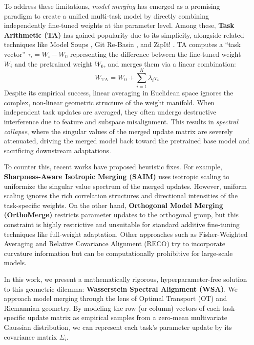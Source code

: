\documentclass{article}
\theoremstyle{plain}
\theoremstyle{definition}
\theoremstyle{remark}
\begin{document}
To address these limitations, \emph{model merging} has emerged as a promising paradigm to create a unified multi-task model by directly combining independently fine-tuned weights at the parameter level. Among these, \textbf{Task Arithmetic (TA)} \cite{ilharco22} has gained popularity due to its simplicity, alongside related techniques like Model Soups \cite{wortsman22}, Git Re-Basin \cite{ainsworth22}, and ZipIt! \cite{stoica23}. TA computes a ``task vector'' $\tau_i = W_i - W_0$ representing the difference between the fine-tuned weight $W_i$ and the pretrained weight $W_0$, and merges them via a linear combination:
\begin{equation}
  W_{\text{TA}} = W_0 + \sum_{i=1}^K \lambda_i \tau_i
\end{equation}
Despite its empirical success, linear averaging in Euclidean space ignores the complex, non-linear geometric structure of the weight manifold. When independent task updates are averaged, they often undergo destructive interference due to feature and subspace misalignment. This results in \emph{spectral collapse}, where the singular values of the merged update matrix are severely attenuated, driving the merged model back toward the pretrained base model and sacrificing downstream adaptations.

To counter this, recent works have proposed heuristic fixes. For example, \textbf{Sharpness-Aware Isotropic Merging (SAIM)} \cite{saim} uses isotropic scaling to uniformize the singular value spectrum of the merged updates. However, uniform scaling ignores the rich correlation structures and directional intensities of the task-specific weights. On the other hand, \textbf{Orthogonal Model Merging (OrthoMerge)} \cite{orthomerge} restricts parameter updates to the orthogonal group, but this constraint is highly restrictive and unsuitable for standard additive fine-tuning techniques like full-weight adaptation. Other approaches such as Fisher-Weighted Averaging \cite{matena22} and Relative Covariance Alignment (RECO) \cite{reco24} try to incorporate curvature information but can be computationally prohibitive for large-scale models.

In this work, we present a mathematically rigorous, hyperparameter-free solution to this geometric dilemma: \textbf{Wasserstein Spectral Alignment (WSA)}. We approach model merging through the lens of Optimal Transport (OT) \cite{kantorovich42, villani03, villani08, peyre19} and Riemannian geometry. By modeling the row (or column) vectors of each task-specific update matrix as empirical samples from a zero-mean multivariate Gaussian distribution, we can represent each task's parameter update by its covariance matrix $\Sigma_i$. 
\end{document}
